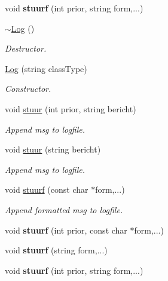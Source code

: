 \begin{DoxyCompactItemize}
\item 
\hypertarget{class_log_abe576654846ce8648083221315b56574}{void {\bfseries stuurf} (int prior, string form,...)}\label{class_log_abe576654846ce8648083221315b56574}

\item 
\hypertarget{class_log_a0fbfda88fbee5027c89f6eb121059360}{\hyperlink{class_log_a0fbfda88fbee5027c89f6eb121059360}{$\sim$\-Log} ()}\label{class_log_a0fbfda88fbee5027c89f6eb121059360}

\begin{DoxyCompactList}\small\item\em Destructor. \end{DoxyCompactList}\item 
\hyperlink{class_log_aafedd292687728b93366ccd4ad90db58}{Log} (string class\-Type)
\begin{DoxyCompactList}\small\item\em Constructor. \end{DoxyCompactList}\item 
void \hyperlink{class_log_a76964f632ca5c006564bc4a1558e397d}{stuur} (int prior, string bericht)
\begin{DoxyCompactList}\small\item\em Append msg to logfile. \end{DoxyCompactList}\item 
void \hyperlink{class_log_a2d00b909358b60805687052ff0da9787}{stuur} (string bericht)
\begin{DoxyCompactList}\small\item\em Append msg to logfile. \end{DoxyCompactList}\item 
void \hyperlink{class_log_a7daac41360c529bab22694f2c4831b61}{stuurf} (const char $\ast$form,...)
\begin{DoxyCompactList}\small\item\em Append formatted msg to logfile. \end{DoxyCompactList}\item 
\hypertarget{class_log_abb994c92ce01a8f95d6946783f8bf4b2}{void {\bfseries stuurf} (int prior, const char $\ast$form,...)}\label{class_log_abb994c92ce01a8f95d6946783f8bf4b2}

\item 
\hypertarget{class_log_ab86c2425cc5702eaed5439e2564450a3}{void {\bfseries stuurf} (string form,...)}\label{class_log_ab86c2425cc5702eaed5439e2564450a3}

\item 
\hypertarget{class_log_abe576654846ce8648083221315b56574}{void {\bfseries stuurf} (int prior, string form,...)}\label{class_log_abe576654846ce8648083221315b56574}


\end{DoxyCompactItemize}

